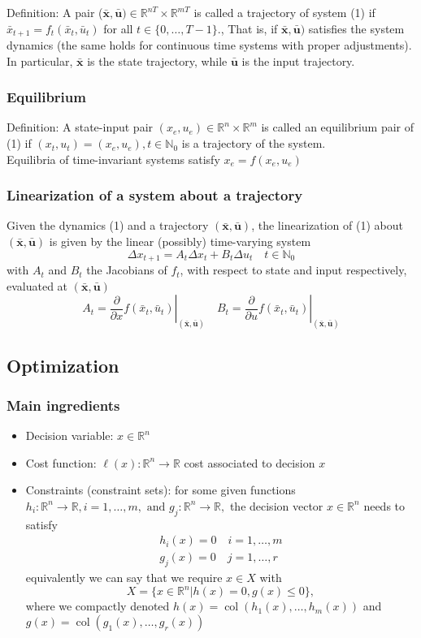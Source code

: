 \documentclass{book}
\newcommand\at[2]{\left.#1\right|_{#2}}
\DeclareMathOperator{\col}{col}
\newcommand{\R}{\mathbb{R}}
\newcommand{\N}{\mathbb{N}}
\begin{document}
Definition: A pair ($\bar{\mathbf{x}},\bar{\mathbf{u}})\in\R^{nT} \times \R^{mT}$ is called a trajectory of system (1) %
if $\bar{x}_{t+1}=f_t(\bar{x}_t,\bar{u}_t)$ for all $t\in\{0,\dots,T-1\}$., That is, if $\bar{\mathbf{x}},\bar{\mathbf{u}})$ satisfies the system dynamics (the same holds for continuous time systems with proper adjustments). In particular, $\bar{\mathbf{x}}$ is the state trajectory, while $\bar{\mathbf{u}}$ is the input trajectory.

\subsubsection{Equilibrium}
Definition: A state-input pair $(x_e,u_e)\in\R^n\times\R^m$ is called an equilibrium pair of (1) %
if $(x_t,u_t)=(x_e,u_e),t\in\N_0$ is a trajectory of the system. \\
Equilibria of time-invariant systems satisfy $x_e=f(x_e,u_e)$

\subsubsection{Linearization of a system about a trajectory}
Given the dynamics (1)%
and a trajectory $(\bar{\mathbf{x}},\bar{\mathbf{u}})$, the linearization of (1) about $(\bar{\mathbf{x}},\bar{\mathbf{u}})$ is given by the linear (possibly) time-varying system 
\[
    \Delta x_{t+1} = A_t\Delta x_t + B_t \Delta u_t \quad t\in\N_0
\]
with $A_t$ and $B_t$ the Jacobians of $f_t$, with respect to state and input respectively, evaluated at $(\bar{\mathbf{x}},\bar{\mathbf{u}})$
\[
A_t = \at{\displaystyle\frac{\partial}{\partial x}f(\bar{x}_t,\bar{u}_t)}{(\bar{\mathbf{x}},\bar{\mathbf{u}})} \quad B_t = \at{\displaystyle\frac{\partial}{\partial u}f(\bar{x}_t,\bar{u}_t)}{(\bar{\mathbf{x}},\bar{\mathbf{u}})}
\]

\subsection{Optimization}
\subsubsection{Main ingredients}
\begin{itemize}
    \item Decision variable: $x\in\R^n$ 
    \item Cost function: $\ell(x):\R^n\to\R$ cost associated to decision $x$
        \item Constraints (constraint sets): for some given functions $h_i:\R^n\to\R, i=1,\dots,m, \text{ and } g_j:\R^n\to\R,$ the decision vector $x\in\R^n$ needs to satisfy 
            \begin{gather*}
                h_i(x)=0 \quad i=1,\dots,m \\
                g_j(x)=0 \quad j=1,\dots,r
            \end{gather*}
        equivalently we can say that we require $x\in X$ with 
        \[
            X=\{x\in\R^n|h(x)=0, g(x)\leq 0\},
        \]
        where we compactly denoted $h(x)=\col(h_1(x),\dots,h_m(x))$ and $g(x) = \col(g_1(x),\dots,g_r(x))$
\end{itemize}
\end{document}
